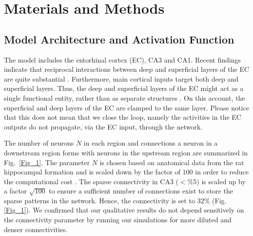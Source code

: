 \documentclass[utf8]{frontiersSCNS} %
\begin{document}
  



\section{Materials and Methods}




\subsection{Model Architecture and Activation Function}


The model includes the entorhinal cortex (EC), CA3 and CA1. 
%
%
Recent findings indicate that reciprocal interactions between deep and superficial layers of the EC are quite substantial \citep{canto2008does, van2003morphological}. Furthermore, main cortical inputs target both deep and superficial layers. Thus, the deep and superficial layers of the EC might act as a single functional entity, rather than as separate structures \citep{kloosterman2000functional}.
%
On this account, the superficial and deep layers of the EC are clamped to the same layer. Please notice that this does not mean that we close the loop, namely the activities in the EC outputs do not propagate, via the EC input, through the network.

The number of neurons $N$ in each region and connections a neuron in a downstream region forms with neurons in the upstream region are summarized in Fig.~\ref{Fig_1}. The parameter $N$ is chosen based on anatomical data from the rat hippocampal formation \citep{amaral1990chapter, cutsuridis2010hippocampal} and is scaled down by the factor of $100$ in order to reduce the computational cost \citep[see][for details]{neher2015memory}. The sparse connectivity in CA3 ($< \%$5) \citep{guzman2016synaptic} is scaled up by a factor $\sqrt{100}$ to ensure a sufficient number of connections exist to store the sparse patterns in the network. Hence, the connectivity is set to $32\%$ (Fig.\:\ref{Fig_1}). 
%
We confirmed that our qualitative results do not depend sensitively on the connectivity parameter by running our simulations for more diluted and denser connectivities.
\end{document}
